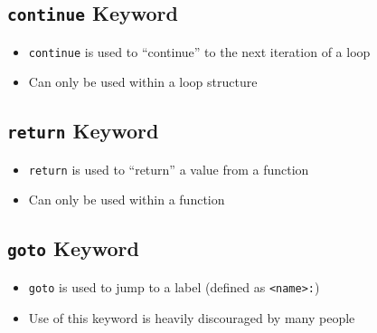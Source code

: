 \documentclass{article}
\begin{document}
\subsection{\texttt{continue} Keyword}

\begin{itemize}
	\item \texttt{continue} is used to ``continue'' to the next iteration of a loop
	\item Can only be used within a loop structure
\end{itemize}



\subsection{\texttt{return} Keyword}

\begin{itemize}
	\item \texttt{return} is used to ``return'' a value from a function
	\item Can only be used within a function

\end{itemize}



\subsection{\texttt{goto} Keyword}

\begin{itemize}
	\item \texttt{goto} is used to jump to a label (defined as \texttt{<name>:})
	\item Use of this keyword is heavily discouraged by many people
\end{itemize}


\end{document}

